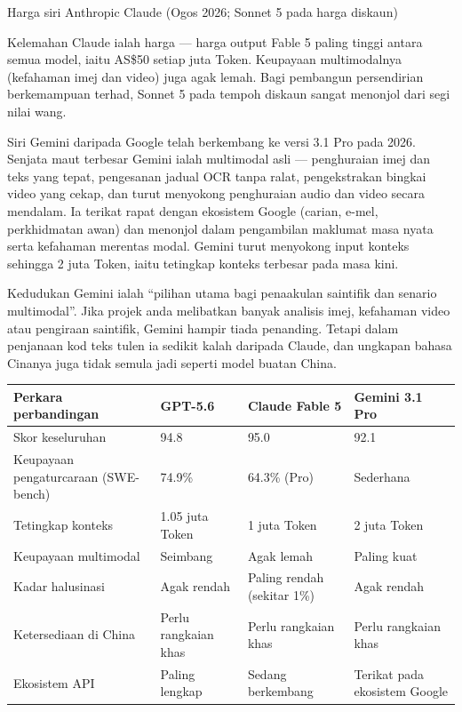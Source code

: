 \begin{center}\small\color{gray}Harga siri Anthropic Claude (Ogos 2026; Sonnet 5 pada harga diskaun)\end{center}

Kelemahan Claude ialah harga — harga output Fable 5 paling tinggi antara semua model, iaitu AS\$50 setiap juta Token. Keupayaan multimodalnya (kefahaman imej dan video) juga agak lemah. Bagi pembangun persendirian berkemampuan terhad, Sonnet 5 pada tempoh diskaun sangat menonjol dari segi nilai wang.


Siri Gemini daripada Google telah berkembang ke versi 3.1 Pro pada 2026. Senjata maut terbesar Gemini ialah multimodal asli — penghuraian imej dan teks yang tepat, pengesanan jadual OCR tanpa ralat, pengekstrakan bingkai video yang cekap, dan turut menyokong penghuraian audio dan video secara mendalam. Ia terikat rapat dengan ekosistem Google (carian, e-mel, perkhidmatan awan) dan menonjol dalam pengambilan maklumat masa nyata serta kefahaman merentas modal. Gemini turut menyokong input konteks sehingga 2 juta Token, iaitu tetingkap konteks terbesar pada masa kini.

Kedudukan Gemini ialah “pilihan utama bagi penaakulan saintifik dan senario multimodal”. Jika projek anda melibatkan banyak analisis imej, kefahaman video atau pengiraan saintifik, Gemini hampir tiada penanding. Tetapi dalam penjanaan kod teks tulen ia sedikit kalah daripada Claude, dan ungkapan bahasa Cinanya juga tidak semula jadi seperti model buatan China.

\begin{center}
\begin{tabularx}{\linewidth}{|X|X|X|X|}
\hline
\textbf{Perkara perbandingan} & \textbf{GPT-5.6} & \textbf{Claude Fable 5} & \textbf{Gemini 3.1 Pro} \tabularnewline
\hline
Skor keseluruhan & 94.8 & 95.0 & 92.1 \tabularnewline
Keupayaan pengaturcaraan (SWE-bench) & 74.9\% & 64.3\% (Pro) & Sederhana \tabularnewline
Tetingkap konteks & 1.05 juta Token & 1 juta Token & 2 juta Token \tabularnewline
Keupayaan multimodal & Seimbang & Agak lemah & Paling kuat \tabularnewline
Kadar halusinasi & Agak rendah & Paling rendah (sekitar 1\%) & Agak rendah \tabularnewline
Ketersediaan di China & Perlu rangkaian khas & Perlu rangkaian khas & Perlu rangkaian khas \tabularnewline
Ekosistem API & Paling lengkap & Sedang berkembang & Terikat pada ekosistem Google \tabularnewline
\hline
\end{tabularx}
\end{center}

